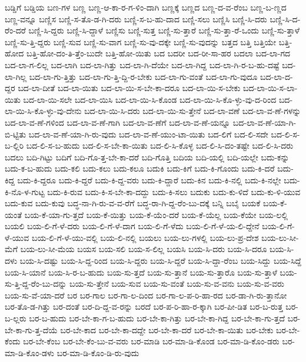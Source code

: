 {ಬಡ್ಡಿಗೆ
ಬಡ್ಡಿಯ
ಬಣ-ಗಳ
ಬಣ್ಣ
ಬಣ್ಣ-ಆ-ಕಾ-ರ-ಗ-ಳಿಂ-ದಾಗಿ
ಬಣ್ಣಕ್ಕೆ
ಬಣ್ಣದ
ಬಣ್ಣ-ದ-ವ-ರೆಂಬ
ಬಣ್ಣ-ಬ-ಣ್ಣದ
ಬಣ್ಣ-ವನ್ನೂ
ಬಣ್ಣಿಸ
ಬಣ್ಣಿ-ಸ-ತೊ-ಡ-ಗಿ-ದರು
ಬಣ್ಣಿ-ಸ-ಬ-ಹು-ದಾದ
ಬಣ್ಣಿ-ಸಲು
ಬಣ್ಣಿಸಿ
ಬಣ್ಣಿ-ಸಿ-ದರು
ಬಣ್ಣಿ-ಸಿ-ದ-ರೆಂ-ದರೆ
ಬಣ್ಣಿ-ಸಿ-ದ್ದರು
ಬಣ್ಣಿ-ಸಿ-ದ್ದಾಳೆ
ಬಣ್ಣಿಸು
ಬಣ್ಣಿ-ಸುತ್ತ
ಬಣ್ಣಿ-ಸು-ತ್ತಾರೆ
ಬಣ್ಣಿ-ಸು-ತ್ತಾ-ರೆ-ಒಂದು
ಬಣ್ಣಿ-ಸು-ತ್ತಾಳೆ
ಬಣ್ಣಿ-ಸು-ತ್ತಿ-ದ್ದರು
ಬಣ್ಣಿ-ಸುವ
ಬಣ್ಣಿ-ಸು-ವಾಗ
ಬಣ್ಣಿ-ಸು-ವು-ದಕ್ಕೇ
ಬಣ್ಣಿ-ಸು-ವುದನ್ನು
ಬತ್ತದ
ಬತ್ತಿ
ಬತ್ತಿಯೇ
ಬತ್ತಿ-ಹೋದ
ಬತ್ತಿ-ಹೋ-ದಂ-ತಿ-ತ್ತೆಂ-ಬುದೇ
ಬತ್ತಿ-ಹೋ-ಯಿತು
ಬದ
ಬದರೀ
ಬದ-ರೀ-ಸಾ-ಹರ
ಬದಲಾ
ಬದ-ಲಾ-ಗದ
ಬದ-ಲಾ-ಗ-ಲಿಲ್ಲ
ಬದ-ಲಾಗಿ
ಬದ-ಲಾ-ಗಿತ್ತು
ಬದ-ಲಾ-ಗಿ-ದೆಯೇ
ಬದ-ಲಾ-ಗಿದ್ದ
ಬದ-ಲಾ-ಗಿ-ರ-ಬ-ಹು-ದಷ್ಟೆ
ಬದ-ಲಾ-ಗಿಲ್ಲ
ಬದ-ಲಾ-ಗು-ತ್ತಿತ್ತು
ಬದ-ಲಾ-ಗು-ತ್ತಿ-ದ್ದಿ-ರ-ಬೇಕು
ಬದ-ಲಾ-ಗು-ವಂತೆ
ಬದ-ಲಾ-ಗು-ವುದೂ
ಬದ-ಲಾ-ದ-ದ್ದರ
ಬದ-ಲಾ-ದೀತೆ
ಬದ-ಲಾ-ಯಿತು
ಬದ-ಲಾ-ಯಿ-ಸ-ಬೇ-ಕಾ-ದರೂ
ಬದ-ಲಾ-ಯಿ-ಸ-ಬೇಕು
ಬದ-ಲಾ-ಯಿ-ಸ-ಲಾ-ಯಿತು
ಬದ-ಲಾ-ಯಿ-ಸಲೇ
ಬದ-ಲಾ-ಯಿಸಿ
ಬದ-ಲಾ-ಯಿ-ಸಿ-ಕೊಂಡ
ಬದ-ಲಾ-ಯಿ-ಸಿ-ಕೊ-ಳ್ಳು-ವು-ದ-ರಿಂದ
ಬದ-ಲಾ-ಯಿ-ಸಿ-ಕೊ-ಳ್ಳು-ವು-ದೇನು
ಬದ-ಲಾ-ಯಿ-ಸಿ-ದರು
ಬದ-ಲಾ-ಯಿ-ಸು-ತ್ತೇನೆ
ಬದ-ಲಾ-ವಣೆ
ಬದ-ಲಾ-ವ-ಣೆ-ಗಳನ್ನು
ಬದ-ಲಾ-ವ-ಣೆ-ಗಳಿಂದ
ಬದ-ಲಾ-ವ-ಣೆ-ಗಾಗಿ
ಬದ-ಲಾ-ವ-ಣೆಗೆ
ಬದ-ಲಾ-ವ-ಣೆ-ಯನ್ನೂ
ಬದ-ಲಾ-ವ-ಣೆ-ಯಾ-ಗಿ-ಬಿ-ಟ್ಟಿತು
ಬದ-ಲಾ-ವ-ಣೆ-ಯಾ-ಗಿ-ರು-ವುದು
ಬದ-ಲಾ-ವ-ಣೆ-ಯುಂ-ಟಾ-ಯಿತು
ಬದ-ಲಿಗೆ
ಬದ-ಲಿ-ಸದೇ
ಬದ-ಲಿ-ಸ-ಬ-ಲ್ಲಿರಿ
ಬದ-ಲಿ-ಸ-ಬ-ಹುದು
ಬದ-ಲಿ-ಸ-ಬೇ-ಕಾ-ಯಿತು
ಬದ-ಲಿ-ಸಿ-ಕೊಳ್ಳ
ಬದ-ಲಿ-ಸಿ-ದಂ-ತಷ್ಟೇ
ಬದ-ಲಿ-ಸಿ-ದರು
ಬದಲು
ಬದಿ-ಗಿಟ್ಟು
ಬದಿಗೆ
ಬದಿ-ಗೊ-ತ್ತ-ಬೇ-ಕಾ-ದರೆ
ಬದಿ-ಗೊತ್ತಿ
ಬದಿಯ
ಬದಿ-ಯಲ್ಲಿ
ಬದಿ-ಯಲ್ಲೇ
ಬದು-ಕನ್ನು
ಬದು-ಕ-ಬ-ಹುದು
ಬದು-ಕಲಿ
ಬದು-ಕಲು
ಬದು-ಕಲೂ
ಬದುಕಿ
ಬದು-ಕಿಗೆ
ಬದು-ಕಿ-ಗೊಂದು
ಬದು-ಕಿ-ದರೆ
ಬದು-ಕಿದ್ದ
ಬದು-ಕಿ-ದ್ದರೂ
ಬದು-ಕಿ-ದ್ದರೆ
ಬದು-ಕಿ-ದ್ದ-ವರು
ಬದು-ಕಿ-ದ್ದಾರೆ
ಬದು-ಕಿನ
ಬದು-ಕಿ-ನಲ್ಲಿ
ಬದು-ಕಿ-ನಲ್ಲೇ
ಬದು-ಕಿ-ನೊ-ಳ-ಗುಟ್ಟ
ಬದು-ಕಿ-ರುವ
ಬದು-ಕಿ-ಸ-ಬೇ-ಕಾ-ದದ್ದು
ಬದು-ಕಿ-ಸಲು
ಬದುಕು
ಬದು-ಕು-ಳಿದೆ
ಬದು-ಕು-ಳಿ-ಯುವ
ಬದು-ಕುವ
ಬದು-ಕುವು
ಬದ್ಧ-ನಾ-ಗಿ-ರು-ವ-ವ-ರೆಗೆ
ಬದ್ಧ-ರಾ-ಗಿ-ದ್ದ-ರೆಂ-ಬು-ದಕ್ಕೆ
ಬನ್ನಿ
ಬಬೈ
ಬಯಕೆ
ಬಯ-ಕೆ-ಯಂತೆ
ಬಯ-ಕೆ-ಯಾ-ಗು-ತ್ತದೆ
ಬಯ-ಕೆ-ಯಿತ್ತು
ಬಯ-ಕೆ-ಯೆಂ-ದರೆ
ಬಯ-ಕೆ-ಯೆಲ್ಲ
ಬಯ-ಕೆಯೇ
ಬಯ-ಲಲ್ಲಿ
ಬಯಲಿ
ಬಯ-ಲಿ-ಗೆ-ಳೆ-ದರು
ಬಯ-ಲಿ-ಗೆ-ಳೆ-ದಾಗ
ಬಯ-ಲಿ-ಗೆ-ಳೆದು
ಬಯ-ಲಿ-ಗೆ-ಳೆ-ಯ-ಲಿ-ದ್ದೇನೆ
ಬಯ-ಲಿ-ಗೆ-ಳೆ-ಯುವ
ಬಯ-ಲಿ-ಗೆ-ಳೆ-ಯು-ವಲ್ಲಿ
ಬಯ-ಲಿ-ನಲ್ಲಿ
ಬಯಲು
ಬಯ-ಲು-ಗಳಲ್ಲಿ
ಬಯ-ಲು-ಪ್ರ-ದೇಶ
ಬಯ-ಲು-ಸೀ-ಮೆಗೆ
ಬಯ-ಲು-ಸೀ-ಮೆಯ
ಬಯಸ
ಬಯ-ಸಲಿ
ಬಯ-ಸ-ಲಿಲ್ಲ
ಬಯಸಿ
ಬಯ-ಸಿ-ದರು
ಬಯ-ಸಿ-ದರೂ
ಬಯ-ಸಿ-ದಳು
ಬಯ-ಸಿ-ದಷ್ಟು
ಬಯ-ಸಿ-ದ್ದ-ರಿಂದ
ಬಯ-ಸಿ-ದ್ದರು
ಬಯ-ಸಿ-ದ್ದರೆ
ಬಯ-ಸಿ-ದ್ದಾ-ರೆಂಬ
ಬಯ-ಸಿದ್ದು
ಬಯ-ಸಿದ್ದೆ
ಬಯ-ಸಿ-ಯಾನೆ
ಬಯ-ಸಿ-ರ-ಬ-ಹುದು
ಬಯ-ಸು-ತ್ತದೆ
ಬಯ-ಸು-ತ್ತಾನೆ
ಬಯ-ಸು-ತ್ತಾರೊ
ಬಯ-ಸು-ತ್ತಾಳೆ
ಬಯ-ಸು-ತ್ತಿ-ದ್ದ-ರೆಂ-ಬು-ದನ್ನು
ಬಯ-ಸು-ತ್ತೇನೆ
ಬಯ-ಸುವ
ಬಯ-ಸು-ವಂತೆ
ಬಯ-ಸು-ವ-ವನು
ಬಯ-ಸು-ವ-ವರು
ಬಯ-ಸು-ವೆ-ಯಾ-ದರೆ
ಬರ
ಬರ-ಗಾಲ
ಬರ-ಗಾ-ಲ-ದಿಂದ
ಬರ-ಗಾ-ಲ-ಪ-ರಿ-ಹಾ-ರದ
ಬರ-ಡಾ-ಗಿ-ರು-ತ್ತಾನೋ
ಬರ-ತೊ-ಡ-ಗಿತ್ತು
ಬರ-ದಂತೆ
ಬರ-ದಿ-ದ್ದ-ವ-ರನ್ನು
ಬರದೆ
ಬರ-ಪ-ರಿ-ಹಾ-ರ-ಕ್ಕಾಗಿ
ಬರ-ಪೀ-ಡಿತ
ಬರ-ಬ-ರುತ್ತ
ಬರ-ಬ-ಲ್ಲರು
ಬರ-ಬ-ಹುದು
ಬರ-ಬೇ-ಕಾ-ಗ-ಬ-ಹುದು
ಬರ-ಬೇ-ಕಾ-ಗಿತ್ತು
ಬರ-ಬೇ-ಕಾ-ಗಿದ್ದ
ಬರ-ಬೇ-ಕಾ-ಗು-ತ್ತದೆ
ಬರ-ಬೇ-ಕಾ-ಗು-ತ್ತ-ದೆಯೆ
ಬರ-ಬೇ-ಕಾದ
ಬರ-ಬೇ-ಕಾ-ದದ್ದೇ
ಬರ-ಬೇ-ಕಾ-ದರೆ
ಬರ-ಬೇ-ಕಾ-ಯಿತು
ಬರ-ಬೇಕು
ಬರ-ಬೇ-ಕೆಂದು
ಬರ-ಬೇ-ಕೆಂಬ
ಬರ-ಬೇ-ಕೆಂ-ಬು-ವ-ವರು
ಬರ-ಮಾಡಿ
ಬರ-ಮಾ-ಡಿ-ಕೊಂಡ
ಬರ-ಮಾ-ಡಿ-ಕೊಂ-ಡರು
ಬರ-ಮಾ-ಡಿ-ಕೊಂ-ಡಳು
ಬರ-ಮಾ-ಡಿ-ಕೊಂ-ಡಿ-ರು-ವುದು
}

